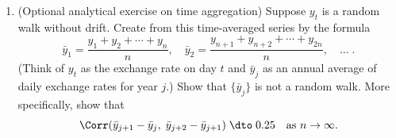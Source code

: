 \begin{problemset}
\begin{enumerate}[label=(\alph*)]
Apply the ADF-GLS $t^\mu$-test to the gold standard subsample 1870--1913.
Choose the lag length by BIC with $p_{\max}$ (the maximum number of lagged
changes in the augmented autoregression, denoted $p_{\max}(T)$ in the text) by~(9.4.31) (so $p_{\max} = 9$). Can you reject the null that the real exchange rate
is driftless I(1)? (Note: The BIC will pick 0 for $p$. The statistic should be
$-2.24$. You should be able to reject the I(1) null at 5 percent.)

\item (Optional analytical exercise on time aggregation) \enspace Suppose $y_t$ is a random
walk without drift. Create from this time-averaged series by the formula
\[
\bar{y}_1 = \frac{y_1 + y_2 + \cdots + y_n}{n}, \quad
\bar{y}_2 = \frac{y_{n+1} + y_{n+2} + \cdots + y_{2n}}{n}, \quad \ldots\;.
\]
(Think of $y_t$ as the exchange rate on day $t$ and $\bar{y}_j$ as an annual average of daily
exchange rates for year $j$.) Show that $\{\bar{y}_j\}$ is not a random walk. More specifically, show that
\[
\Corr(\bar{y}_{j+1} - \bar{y}_j,\; \bar{y}_{j+2} - \bar{y}_{j+1}) \;\dto\; 0.25 \quad \text{as } n \to \infty.
\]
\end{enumerate}

\end{problemset}

